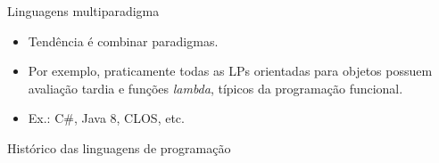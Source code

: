 \documentclass[handout, aspectratio=169]{beamer}
\newcommand{\bi}{\begin{itemize}[<+->]}
\newcommand{\ei}{\end{itemize}}
\begin{document}
\begin{frame}{Linguagens multiparadigma}
    \bi
    \item Tendência é combinar paradigmas.
    \item Por exemplo, praticamente todas as LPs orientadas para objetos possuem avaliação tardia e funções \textit{lambda}, típicos da programação funcional.
    \item Ex.: C\#, Java 8, CLOS, etc.
    \ei
\end{frame}

\begin{frame}{Histórico das linguagens de programação}
    \begin{center}
    \end{center}
\end{frame}
\end{document}
